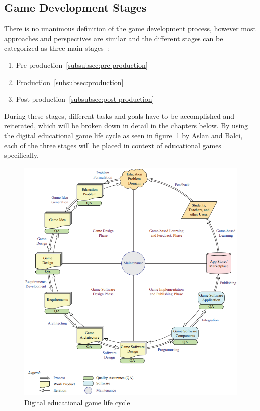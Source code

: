 \subsection{Game Development Stages}\label{subsec:game-design-stages}
There is no unanimous definition of the game development process, however most approaches and perspectives are similar and the different
stages can be categorized as three main stages~\cite{cg:game-design-stages}:
\begin{enumerate}
    \item Pre-production~\ref{subsubsec:pre-production}
    \item Production~\ref{subsubsec:production}
    \item Post-production~\ref{subsubsec:post-production}
\end{enumerate}
During these stages, different tasks and goals have to be accomplished and reiterated, which will be broken down in detail in the chapters below.
By using the digital educational game life cycle as seen in figure~\ref{fig:deglc} by Aslan and Balci, each of the three stages will be placed in context of
educational games specifically.
\begin{figure}
    \centering
    \includegraphics[width=\textwidth]{Pictures/res/fundamentals/deglc}
    \caption{Digital educational game life cycle~\cite{GAMED}}
    \label{fig:deglc}
\end{figure}

